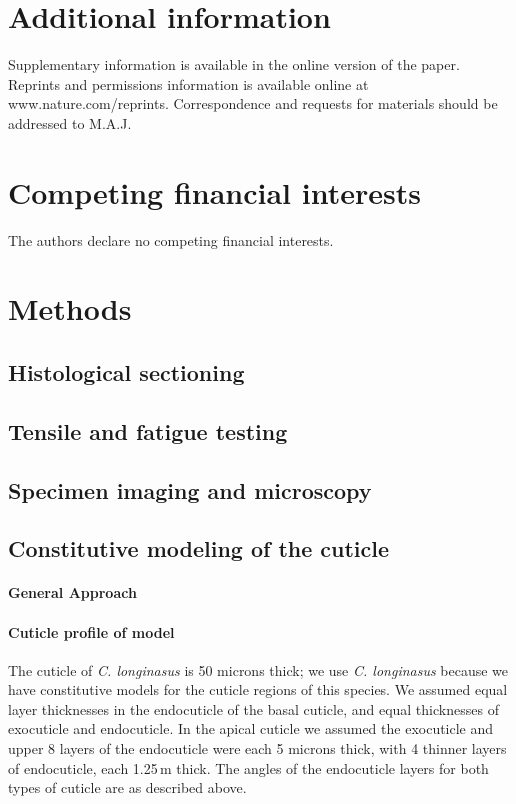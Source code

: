 \documentclass[twocolumn, linenumbers, superscriptaddress]{revtex4-1}
\begin{document}
	\section*{Additional information}
		Supplementary information is available in the online version of the paper.
		Reprints and permissions information is available online at www.nature.com/reprints.
		Correspondence and requests for materials should be addressed to M.A.J.
	
	\section*{Competing financial interests}
		The authors declare no competing financial interests.
	
	\newpage

	\section*{Methods}
		\subsection*{Histological sectioning}
			
		\subsection*{Tensile and fatigue testing}

		\subsection*{Specimen imaging and microscopy}
		
		\subsection*{Constitutive modeling of the cuticle}
			\paragraph*{General Approach}
			\paragraph*{Cuticle profile of model}
				The cuticle of \textit{C. longinasus} is 50 microns thick; we use \textit{C. longinasus} because we have constitutive models for the cuticle regions of this species.
				We assumed equal layer thicknesses in the endocuticle of the basal cuticle, and equal thicknesses of exocuticle and endocuticle.
				In the apical cuticle we assumed the exocuticle and upper 8 layers of the endocuticle were each 5 microns thick, with 4 thinner layers of endocuticle, each 1.25\,{\textmu}m thick.
				The angles of the endocuticle layers for both types of cuticle are as described above.
\end{document}

